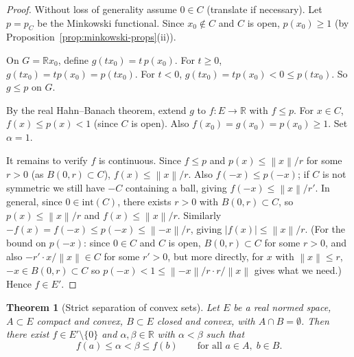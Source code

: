 \documentclass[a4paper,12pt]{book}
\newcommand{\R}{\mathbb{R}}
\newcommand{\norm}[1]{\left\| #1 \right\|}
\newcommand{\abs}[1]{\left| #1 \right|}
\theoremstyle{definition}
\theoremstyle{plain}
\newtheorem{theorem}[definition]{Theorem}
\theoremstyle{remark}
\begin{document}
\begin{proof}
Without loss of generality assume $0\in C$ (translate if necessary). Let
$p=p_C$ be the Minkowski functional. Since $x_0\notin C$ and $C$ is open,
$p(x_0)\geq 1$ (by Proposition~\ref{prop:minkowski-props}(ii)).

On $G=\R x_0$, define $g(tx_0)=t\,p(x_0)$. For $t\geq 0$,
$g(tx_0)=tp(x_0)=p(tx_0)$. For $t<0$, $g(tx_0)=tp(x_0)<0\leq p(tx_0)$.
So $g\leq p$ on $G$.

By the real Hahn--Banach theorem, extend $g$ to $f\colon E\to\R$ with $f\leq p$.
For $x\in C$, $f(x)\leq p(x)<1$ (since $C$ is open). Also
$f(x_0)=g(x_0)=p(x_0)\geq 1$. Set $\alpha=1$.

It remains to verify $f$ is continuous. Since $f\leq p$ and $p(x)\leq\norm{x}/r$
for some $r>0$ (as $B(0,r)\subset C$), $f(x)\leq\norm{x}/r$. Also
$f(-x)\leq p(-x)$; if $C$ is not symmetric we still have $-C$ containing a ball,
giving $f(-x)\leq\norm{x}/r'$. In general, since $0\in\mathrm{int}(C)$, there
exists $r>0$ with $B(0,r)\subset C$, so $p(x)\leq\norm{x}/r$ and
$f(x)\leq\norm{x}/r$. Similarly $-f(x)=f(-x)\leq p(-x)\leq\norm{-x}/r$, giving
$\abs{f(x)}\leq\norm{x}/r$. (For the bound on $p(-x)$: since $0\in C$ and $C$ is
open, $B(0,r)\subset C$ for some $r>0$, and also $-r'\cdot x/\norm{x}\in C$ for
some $r'>0$, but more directly, for $x$ with $\norm{x}\leq r$, $-x\in B(0,r)
\subset C$ so $p(-x)<1\leq\norm{-x}/r\cdot r/\norm{x}$ gives what we need.)
Hence $f\in E'$.
\end{proof}

\begin{theorem}[Strict separation of convex sets]\label{thm:strict-separation}
Let $E$ be a real normed space, $A\subset E$ compact and convex, $B\subset E$
closed and convex, with $A\cap B=\emptyset$. Then there exist $f\in E'\setminus\{0\}$
and $\alpha,\beta\in\R$ with $\alpha<\beta$ such that
\[
  f(a)\leq\alpha < \beta\leq f(b) \qquad\text{for all } a\in A,\; b\in B.
\]
\end{theorem}
\end{document}
